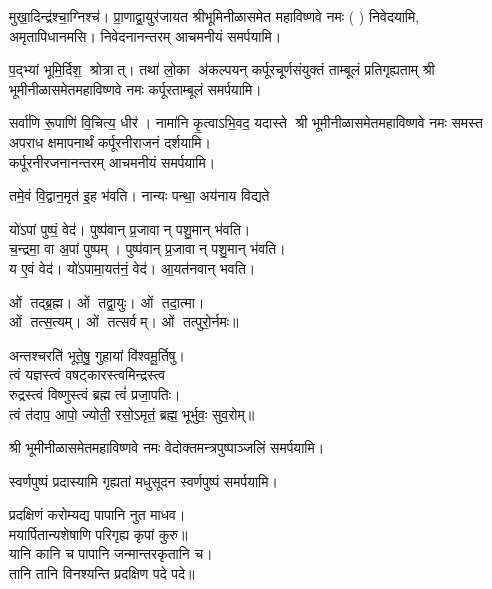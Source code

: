 \begin{center}
 {मुखा॒दिन्द्र॑श्चा॒ग्निश्च॑। प्रा॒णाद्वा॒युर॑जायत}
श्रीभूमिनीळासमेत महाविष्णवे नमः (	) निवेदयामि, \\
अमृतापिधानमसि। निवेदनानन्तरम् आचमनीयं समर्पयामि।\medskip

{प॒द्भ्यां भूमि॒र्दिश॒ श्रोत्रात्। तथा॑ लो॒का अ॑कल्पयन्}
{कर्पूरचूर्णसंयुक्तं ताम्बूलं प्रतिगृह्यताम्}
श्री भूमीनीळासमेतमहाविष्णवे नमः कर्पूरताम्बूलं समर्पयामि।\medskip

{सर्वा॑णि रू॒पाणि॑ वि॒चित्य॒ धीर॑। नामा॑नि कृ॒त्वाऽभि॒वद॒\an{} यदास्ते}
श्री भूमीनीळासमेतमहाविष्णवे नमः समस्त अपराध क्षमापनार्थं कर्पूरनीराजनं दर्शयामि।\\
कर्पूरनीरजनानन्तरम् आचमनीयं समर्पयामि।\medskip

 {तमे॒वं वि॒द्वान॒मृत॑ इ॒ह भ॑वति। नान्यः पन्था॒ अय॑नाय विद्यते}

 यो॑ऽपां पुष्पं॒ वेद॑। पुष्प॑वान् प्र॒जावान् पशु॒मान् भ॑वति।\\
च॒न्द्रमा॒ वा अ॒पां पुष्पम्। पुष्प॑वान् प्र॒जावान् पशु॒मान् भ॑वति।\\
य ए॒वं वेद॑। यो॑ऽपामा॒यत॑नं॒ वेद॑। आ॒यत॑नवान् भवति।\medskip

ओं तद्ब्र॒ह्म। ओं तद्वा॒युः। ओं तदा॒त्मा।\\ ओं तत्स॒त्यम्‌।
ओं तत्सर्वम्‌। ओं तत्पुरो॒र्नमः॥\medskip

अन्तश्चरति॑ भूते॒षु॒ गुहायां वि॑श्वमू॒र्तिषु। \\
त्वं यज्ञस्त्वं वषट्कारस्त्वमिन्द्रस्त्व\\ रुद्रस्त्वं विष्णुस्त्वं ब्रह्म त्वं॑ प्रजा॒पतिः। \\
त्वं त॑दाप॒ आपो॒ ज्योती॒ रसो॒ऽमृतं॒ ब्रह्म॒ भूर्भुवः॒ सुव॒रोम्‌॥\medskip

\medskip

श्री भूमीनीळासमेतमहाविष्णवे नमः वेदोक्तमन्त्रपुष्पाञ्जलिं समर्पयामि।\medskip

{स्वर्णपुष्पं प्रदास्यामि गृह्यतां मधुसूदन}
स्वर्णपुष्पं समर्पयामि।\medskip

प्रदक्षिणं करोम्यद्य पापानि नुत माधव।\\
मयार्पितान्यशेषाणि परिगृह्य कृपां कुरु॥\\
 यानि कानि च पापानि जन्मान्तरकृतानि च।\\
तानि तानि विनश्यन्ति प्रदक्षिण पदे पदे॥\medskip


\end{center}
